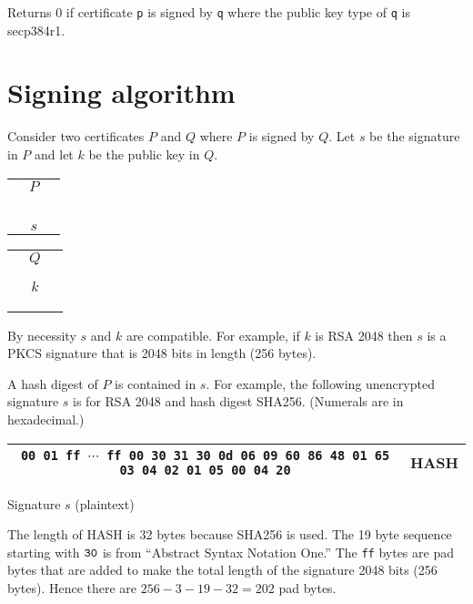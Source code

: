 \documentclass[12pt]{article}
\begin{document}
\noindent
Returns 0 if certificate {\tt p} is signed by {\tt q}
where the public key type of {\tt q} is secp384r1.

\newpage
\section{Signing algorithm}

\noindent
Consider two certificates $P$ and $Q$ where $P$ is signed by $Q$.
Let $s$ be the signature in $P$ and let $k$ be the public
key in $Q$.

\begin{center}
\begin{tabular}{|c|}
\hline
$\quad P\quad$\\
\\
\\
\\
\\
\\
\hline
$s$\\
\hline
\end{tabular}
\qquad
\begin{tabular}{|c|}
\hline
$\quad Q\quad$\\
\\
\\
\hline
$k$\\
\hline
\\
\\
\\
\hline
\end{tabular}
\end{center}

\noindent
By necessity $s$ and $k$ are compatible.
For example, if $k$ is RSA 2048 then $s$ is a PKCS signature that is 2048 bits in length
(256 bytes).

\bigskip
\noindent
A hash digest of $P$ is contained in $s$.
For example, the following unencrypted signature $s$ is for RSA 2048 and hash digest SHA256.
(Numerals are in hexadecimal.)

\begin{center}
\begin{tabular}{|c|c|}
\hline
{\footnotesize\tt 00 01 ff $\cdots$ ff 00 30 31 30 0d 06 09 60 86 48 01 65 03 04 02 01 05 00 04 20} & HASH\\
\hline
\end{tabular}

\medskip
Signature $s$ (plaintext)
\end{center}

\noindent
The length of HASH is 32 bytes because SHA256 is used.
The 19 byte sequence starting with $\tt 30$ is from
``Abstract Syntax Notation One.''
The {\tt ff} bytes are pad bytes that are added to make the total length of the signature 2048 bits (256 bytes).
Hence there are $256-3-19-32=202$ pad bytes.
\end{document}
